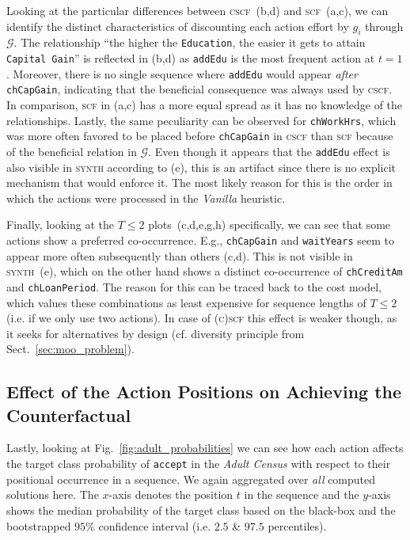 \documentclass[runningheads, envcountsame, a4paper]{llncs}
\newcommand{\ours}{\textsc{cscf}}
\newcommand{\oursShort}{\ours}
\newcommand{\oursBoth}{\textsc{(c)scf}}
\newcommand{\mainEA}{\oursShort}
\newcommand{\competitor}{\textsc{synth}}
\newcommand{\alternativeEA}{\textsc{scf}}
\newcommand{\adultDataset}{\emph{Adult Census}}
\newcommand{\state}{\mathbf{x}}
\newcommand{\targetclass}{\texttt{accept}}
\newcommand{\blackbox}{f}
\newcommand{\dependencyGraph}{\mathcal{G}}
\newcommand{\consequentialCosts}{g}
\begin{document}
Looking at the particular differences between \mainEA{}~(b,d) and \alternativeEA{}~(a,c), we can identify the distinct characteristics of discounting each action effort by $\consequentialCosts_i$ through $\dependencyGraph$. The relationship \enquote{the higher the \texttt{Education}, the easier it gets to attain \texttt{Capital Gain}} is reflected in (b,d) as \texttt{addEdu} is the most frequent action at $t=1$. Moreover, there is no single sequence where \texttt{addEdu} would appear \emph{after} \texttt{chCapGain}, indicating that the beneficial consequence was always used by \mainEA{}. In comparison, \alternativeEA{} in (a,c) has a more equal spread as it has no knowledge of the relationships. Lastly, the same peculiarity can be observed for \texttt{chWorkHrs}, which was more often favored to be placed before \texttt{chCapGain} in \mainEA{} than \alternativeEA{} because of the beneficial relation in $\dependencyGraph$.
Even though it appears that the \texttt{addEdu} effect is also visible in \competitor{} according to (e), this is an artifact since there is no explicit mechanism that would enforce it.
The most likely reason for this is the order in which the actions were processed in the \emph{Vanilla} heuristic.

Finally, looking at the $T \leq 2$ plots~(c,d,e,g,h) specifically, we can see that some actions show a preferred co-occurrence. E.g., \texttt{chCapGain} and \texttt{waitYears} seem to appear more often subsequently than others (c,d). This is not visible in \competitor{}~(e), which on the other hand shows a distinct co-occurrence of \texttt{chCreditAm} and \texttt{chLoanPeriod}.
The reason for this can be traced back to the cost model, which values these combinations as least expensive for sequence lengths of $T \leq 2$ (i.e. if we only use two actions). In case of \oursBoth{} this effect is weaker though, as it seeks for alternatives by design (cf. diversity principle from Sect.~\ref{sec:moo_problem}).

\subsection{Effect of the Action Positions on Achieving the Counterfactual}
\label{sec:exp_action_class_response}
Lastly, looking at Fig.~\ref{fig:adult_probabilities} we can see how each action affects the target class probability of \targetclass{} in the \adultDataset{} with respect to their positional occurrence in a sequence. We again aggregated over \emph{all} computed solutions here.
The $x$-axis denotes the position $t$ in the sequence and the $y$-axis shows the median probability of the target class based on the black-box and the bootstrapped $95\%$ confidence interval (i.e. $2.5$ \& $97.5$ percentiles). 
\end{document}
